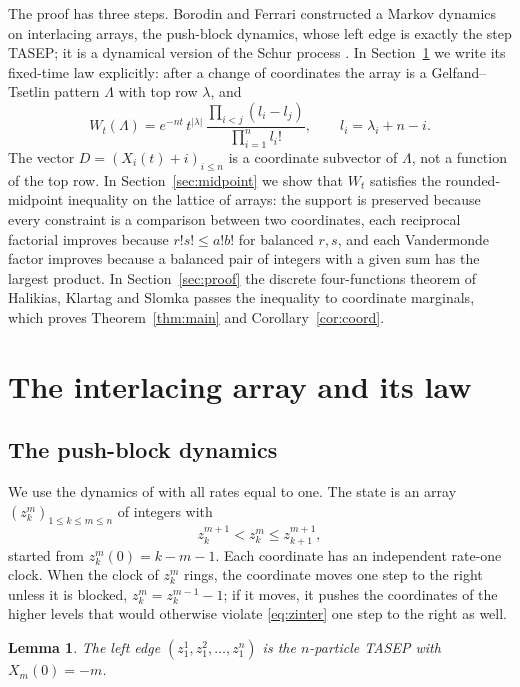 \documentclass[11pt]{amsart}
\newtheorem{lemma}[theorem]{Lemma}
\theoremstyle{remark}
\numberwithin{equation}{section}
\newcommand{\1}{\mathbf 1}
\begin{document}
The proof has three steps. Borodin and Ferrari \cite{BF} constructed a Markov dynamics on interlacing arrays, the push-block dynamics, whose left edge is exactly the step TASEP; it is a dynamical version of the Schur process \cite{OR}. In Section~\ref{sec:array} we write its fixed-time law explicitly: after a change of coordinates the array is a Gelfand--Tsetlin pattern $\Lambda$ with top row $\lambda$, and
\begin{equation}\label{eq:W}
W_t(\Lambda)=e^{-nt}\,t^{|\lambda|}\,\frac{\prod_{i<j}(l_i-l_j)}{\prod_{i=1}^n l_i!},\qquad l_i=\lambda_i+n-i.
\end{equation}
The vector $D=(X_i(t)+i)_{i\le n}$ is a coordinate subvector of $\Lambda$, not a function of the top row. In Section~\ref{sec:midpoint} we show that $W_t$ satisfies the rounded-midpoint inequality on the lattice of arrays: the support is preserved because every constraint is a comparison between two coordinates, each reciprocal factorial improves because $r!s!\le a!b!$ for balanced $r,s$, and each Vandermonde factor improves because a balanced pair of integers with a given sum has the largest product. In Section~\ref{sec:proof} the discrete four-functions theorem of Halikias, Klartag and Slomka \cite{HKS} passes the inequality to coordinate marginals, which proves Theorem~\ref{thm:main} and Corollary~\ref{cor:coord}.

\section{The interlacing array and its law}\label{sec:array}

\subsection{The push-block dynamics}
We use the dynamics of \cite[Section~1.1]{BF} with all rates equal to one. The state is an array $(z^m_k)_{1\le k\le m\le n}$ of integers with
\begin{equation}\label{eq:zinter}
z^{m+1}_k<z^m_k\le z^{m+1}_{k+1},
\end{equation}
started from $z^m_k(0)=k-m-1$. Each coordinate has an independent rate-one clock. When the clock of $z^m_k$ rings, the coordinate moves one step to the right unless it is blocked, $z^m_k=z^{m-1}_k-1$; if it moves, it pushes the coordinates of the higher levels that would otherwise violate \eqref{eq:zinter} one step to the right as well.

\begin{lemma}\label{lem:edge}
The left edge $(z^1_1,z^2_1,\dots,z^n_1)$ is the $n$-particle TASEP with $X_m(0)=-m$.
\end{lemma}
\end{document}
